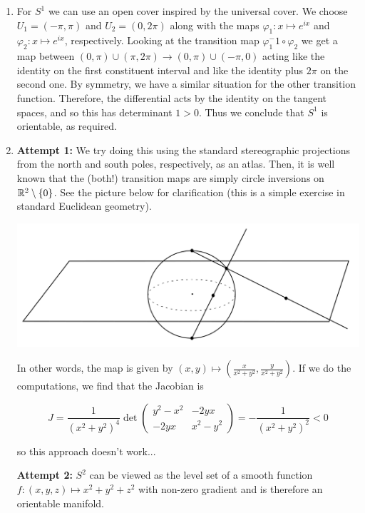 \begin{enumerate}[label=(\alph*)]
    \item For $S^1$ we can use an open cover inspired by the universal cover. We choose $U_1=(-\pi,\pi)$ and $U_2=(0,2\pi)$ along with the maps $\varphi_1:x\mapsto e^{ix}$ and $\varphi_2:x\mapsto e^{ix}$, respectively. Looking at the transition map $\varphi_1^-1\circ \varphi_2$ we get a map between $(0,\pi)\cup (\pi,2\pi)\to (0,\pi)\cup (-\pi,0)$ acting like the identity on the first constituent interval and like the identity plus $2\pi$ on the second one. By symmetry, we have a similar situation for the other transition function. Therefore, the differential acts by the identity on the tangent spaces, and so this has determinant $1>0$. Thus we conclude that $S^1$ is orientable, as required.
    \item \textbf{Attempt 1:} We try doing this using the standard stereographic projections from the north and south poles, respectively, as an atlas. Then, it is well known that the (both!) transition maps are simply circle inversions on $\mathbb{R}^2\setminus \{0\}$. See the picture below for clarification (this is a simple exercise in standard Euclidean geometry).
    
    \begin{center}
            \includegraphics[width=150mm]{images/Exercises/stereotransition.png}
    \end{center}

    In other words, the map is given by $(x,y)\mapsto (\frac{x}{x^2+y^2},\frac{y}{x^2+y^2})$. If we do the computations, we find that the Jacobian is 

    $$J=\frac{1}{(x^2+y^2)^4}\det  \begin{pmatrix} y^2-x^2 & -2yx \\ -2yx & x^2-y^2  \end{pmatrix}=-\frac{1}{(x^2+y^2)^2}<0$$

    so this approach doesn't work...\newline

    \textbf{Attempt 2:} $S^2$ can be viewed as the level set of a smooth function $f: (x,y,z)\mapsto x^2+y^2+z^2$ with non-zero gradient and is therefore an orientable manifold.\newline


\end{enumerate}
